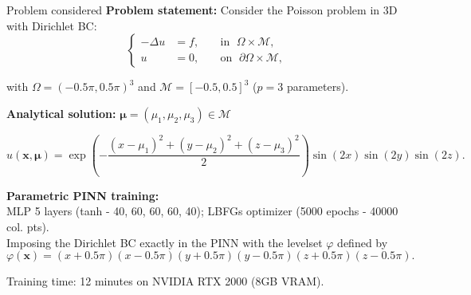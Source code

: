 \begin{frame}{Problem considered} 
	\textbf{Problem statement:} Consider the Poisson problem in 3D with Dirichlet BC:
	\vspace{-5pt}
	\begin{equation*}
		\left\{
		\begin{aligned}
			-\Delta u & = f, \; &  & \text{in } \; \Omega \times \mathcal{M}, \\
			u         & =0, \;  &  & \text{on } \; \partial\Omega \times \mathcal{M},
		\end{aligned}
		\right.
	\end{equation*}

	\vspace{-5pt}
	with $\Omega=(-0.5 \pi, 0.5 \pi)^3$ and $\mathcal{M}=[-0.5,0.5]^3$ ($p=3$ parameters).
		
	\vspace{8pt}
	\textbf{Analytical solution:} $\bm{\mu}=(\mu_1,\mu_2,\mu_3) \in \mathcal{M}$

	\vspace{-5pt}
	\begin{equation*}
		u(\bm{x},\bm{\mu})=\exp\left(-\frac{{(x-\mu_1)}^2+{(y-\mu_2)}^2+{(z-\mu_3)}^2}{2}\right)\sin(2x)\sin(2y)\sin(2z).
	\end{equation*}

	\vspace{12pt}
	\textbf{Parametric PINN training:} \\
	MLP 5 layers (tanh - 40, 60, 60, 60, 40); LBFGs optimizer (5000 epochs - 40000 col. pts). \\
	Imposing the Dirichlet BC exactly in the PINN with the levelset $\varphi$ defined by
	$$\varphi(\bm{x})=(x+0.5\pi)(x-0.5\pi)(y+0.5\pi)(y-0.5\pi)(z+0.5\pi)(z-0.5\pi).$$
	
	\small
	Training time: 12 minutes on NVIDIA RTX 2000 (8GB VRAM).
\end{frame}


